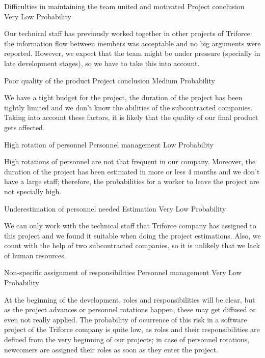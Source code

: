 \begin{risk}[riskMotivation]{Difficulties in maintaining the team united and motivated}
\riskcat Project conclusion
 Very Low Probability

Our technical staff has previously worked together in other projects of Triforce: the information flow between members was acceptable and no big arguments were reported. However, we expect that the team might be under pressure (specially in late development stages), so we have to take this into account.
\end{risk}

\begin{risk}[riskQuality]{Poor quality of the product}
\riskcat Project conclusion
 Medium Probability

We have a tight budget for the project, the duration of the project has been tightly limited and we don't know the abilities of the subcontracted companies. Taking into account these factors, it is likely that the quality of our final product gets affected.
\end{risk}

\begin{risk}[riskPersonnelRotation]{High rotation of personnel}
\riskcat Personnel management
 Low Probability

High rotations of personnel are not that frequent in our company. Moreover, the duration of the project has been estimated in more or less 4 months and we don't have a large staff; therefore, the probabilities for a worker to leave the project are not specially high.
\end{risk}

\begin{risk}[riskPersonnelUnderestimation]{Underestimation of personnel needed}
\riskcat Estimation
 Very Low Probability

We can only work with the technical staff that Triforce company has assigned to this project and we found it suitable when doing the project estimations. Also, we count with the help of two subcontracted companies, so it is unlikely that we lack of human resources.
\end{risk}

\begin{risk}[riskResponsibilitesAssignment]{Non-specific assignment of responsibilities}
\riskcat Personnel management
 Very Low Probability

At the beginning of the development, roles and responsibilities will be clear, but as the project advances or personnel rotations happen, these may get diffused or even not really applied. The probability of ocurrence of this risk in a software project of the Triforce company is quite low, as roles and their responsibilities are defined from the very beginning of our projects; in case of personnel rotations, newcomers are assigned their roles as soon as they enter the project.
\end{risk}

